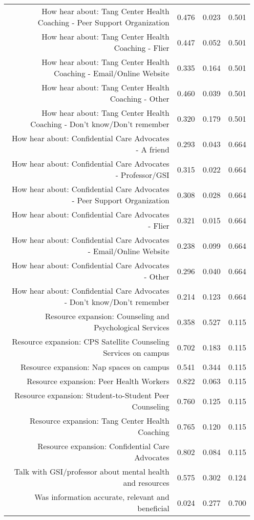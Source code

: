 \documentclass{article}\usepackage[]{graphicx}\usepackage[]{color}
\begin{document}
\begin{table}[H]
{\begin{tabular}{rrrr}
  How hear about: Tang Center Health Coaching - Peer Support Organization & 0.476 & 0.023 & 0.501 \\ 
  How hear about: Tang Center Health Coaching - Flier & 0.447 & 0.052 & 0.501 \\ 
  How hear about: Tang Center Health Coaching - Email/Online Website & 0.335 & 0.164 & 0.501 \\ 
  How hear about: Tang Center Health Coaching - Other & 0.460 & 0.039 & 0.501 \\ 
  How hear about: Tang Center Health Coaching - Don't know/Don't remember & 0.320 & 0.179 & 0.501 \\ 
  How hear about: Confidential Care Advocates - A friend & 0.293 & 0.043 & 0.664 \\ 
  How hear about: Confidential Care Advocates - Professor/GSI & 0.315 & 0.022 & 0.664 \\ 
  How hear about: Confidential Care Advocates - Peer Support Organization & 0.308 & 0.028 & 0.664 \\ 
  How hear about: Confidential Care Advocates - Flier & 0.321 & 0.015 & 0.664 \\ 
  How hear about: Confidential Care Advocates - Email/Online Website & 0.238 & 0.099 & 0.664 \\ 
  How hear about: Confidential Care Advocates - Other & 0.296 & 0.040 & 0.664 \\ 
  How hear about: Confidential Care Advocates - Don't know/Don't remember & 0.214 & 0.123 & 0.664 \\ 
  Resource expansion: Counseling and Psychological Services & 0.358 & 0.527 & 0.115 \\ 
  Resource expansion: CPS Satellite Counseling Services on campus & 0.702 & 0.183 & 0.115 \\ 
  Resource expansion: Nap spaces on campus & 0.541 & 0.344 & 0.115 \\ 
  Resource expansion: Peer Health Workers & 0.822 & 0.063 & 0.115 \\ 
  Resource expansion: Student-to-Student Peer Counseling & 0.760 & 0.125 & 0.115 \\ 
  Resource expansion: Tang Center Health Coaching & 0.765 & 0.120 & 0.115 \\ 
  Resource expansion: Confidential Care Advocates & 0.802 & 0.084 & 0.115 \\ 
  Talk with GSI/professor about mental health and resources & 0.575 & 0.302 & 0.124 \\ 
  Was information accurate, relevant and beneficial & 0.024 & 0.277 & 0.700 \\ 
   \hline
\end{tabular}
}
\end{table}
\end{document}
